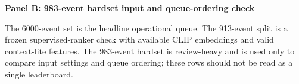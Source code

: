 \begin{table}[t]
\textbf{Panel B: 983-event hardset input and queue-ordering check}\par\vspace{0.25em}
\vspace{0.25em}
\begin{minipage}{0.96\linewidth}
\footnotesize
The 6000-event set is the headline operational queue. The 913-event split is a frozen supervised-ranker check with available CLIP embeddings and valid context-lite features. The 983-event hardset is review-heavy and is used only to compare input settings and queue ordering; these rows should not be read as a single leaderboard.
\end{minipage}
\end{table}
